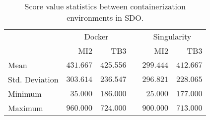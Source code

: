 \begin{table}[!h]
	\centering
       \caption{Score value statistics between containerization environments in SDO.}
        \label{tab:stats_score_sdo-evn-test}
	{
		\begin{tabular}{lrrcrr}
			\toprule
            \multicolumn{1}{c}{} & \multicolumn{2}{c}{Docker} & &\multicolumn{2}{c}{Singularity} \\
             \cline{2-3} \cline{5-6} 
			 &  MI2 & TB3 & &MI2 & TB3  \\
			\cmidrule[0.4pt]{1-6}
			Mean & $431.667$ & $425.556$ && $299.444$ & $412.667$  \\
			Std. Deviation & $303.614$ & $236.547$ && $296.821$ & $228.065$  \\
			Minimum & $35.000$ & $186.000$ && $25.000$ & $177.000$  \\
			Maximum & $960.000$ & $724.000$ && $900.000$ & $713.000$  \\
			\bottomrule
		\end{tabular}
	}
\end{table}
